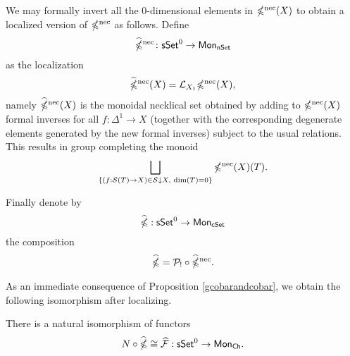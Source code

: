 We may formally invert all the $0$-dimensional elements in $\mathbb{\Omega}^{\text{nec}}(X)$ to obtain a localized version of $\mathbb{\Omega}^{\text{nec}}$ as follows. Define 
$$\widehat{\mathbb{\Omega}}^{\text{nec}} \colon \mathsf{sSet}^0 \to \mathsf{Mon}_{\mathsf{nSet}}$$
as the localization
$$\widehat{\mathbb{\Omega}}^{\text{nec}}(X)= \mathcal{L}_{X_1}\mathbb{\Omega}^{\text{nec}}(X),$$
namely $\widehat{\mathbb{\Omega}}^{\text{nec}}(X)$ is the monoidal necklical set obtained by adding to $\mathbb{\Omega}^{\text{nec}}(X)$  formal inverses for all $f\colon \Delta^1 \to X$ (together with the corresponding degenerate elements generated by the new formal inverses) subject to the usual relations. This results in group completing the monoid
$$\bigsqcup_{\{(f: \mathcal{S}(T)\to X )\in \mathcal{S} \downarrow X, \text{ dim}(T)=0\}} \mathbb{\Omega}^{\text{nec}}(X)(T).$$

Finally denote by $$\widehat{\mathbb{\Omega}}: \mathsf{sSet}^0 \to \mathsf{Mon}_{\mathsf{cSet}}$$ the composition $$\widehat{\mathbb{\Omega}}= \mathcal{P}_{!} \circ \widehat{\mathbb{\Omega}}^{\text{nec}}.$$ 

As an immediate consequence of Proposition \ref{gcobarandcobar}, we obtain the following isomorphism after localizing.

\begin{corollary}\label{localizedcobar}
There is a natural isomorphism of functors
$$N \circ \widehat{\mathbb{\Omega}} \cong \widehat{\mathcal{F}} :\mathsf{sSet}^0 \to \mathsf{Mon}_{\mathsf{Ch}}.$$ 
\end{corollary}


